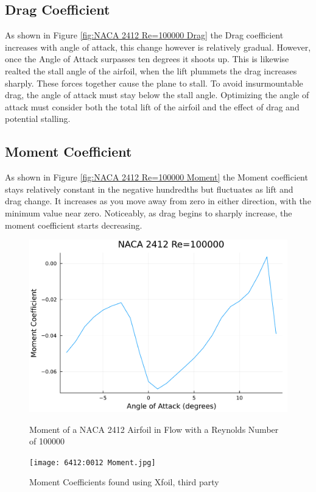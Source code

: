 \documentclass{article}
\begin{document}
\subsection{Drag Coefficient}
As shown in Figure \ref{fig:NACA 2412 Re=100000 Drag} the Drag coefficient increases with angle of attack, this change however is relatively gradual. However, once the Angle of Attack surpasses ten degrees it shoots up. This is likewise realted the stall angle of the airfoil, when the lift plummets the drag increases sharply. These forces together cause the plane to stall. To avoid insurmountable drag, the angle of attack must stay below the stall angle. Optimizing the angle of attack must consider both the total lift of the airfoil and the effect of drag and potential stalling.


\subsection{Moment Coefficient}
As shown in Figure \ref{fig:NACA 2412 Re=100000 Moment} the Moment coefficient stays relatively constant in the negative hundredths but fluctuates as lift and drag change. It increases as you move away from zero in either direction, with the minimum value near zero. Noticeably, as drag begins to sharply increase, the moment coefficient starts decreasing.

\begin{figure}[h]
    \centering
\begin{minipage}[b]{0.45\textwidth}
\centering
\includegraphics[width=\textwidth]{NACA 2412 Re=100000_Moment_Coefficent_Plot.pdf}
\caption{\label{fig:NACA 2412 Re=100000 Moment}Moment of a NACA 2412 Airfoil in Flow with a Reynolds Number of 100000}
\end{minipage}
\begin{minipage}[b]{0.45\textwidth}
\centering
\texttt{[image: 6412:0012 Moment.jpg]}
\caption{\label{fig:Xfoil Moment}Moment Coefficients found using Xfoil, third party}
\end{minipage}
\end{figure}
\end{document}
